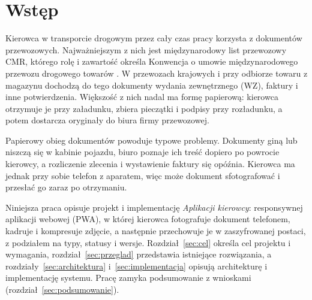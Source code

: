 \section{Wstęp}
\label{sec:wstep}

Kierowca w transporcie drogowym przez cały czas pracy korzysta z dokumentów
przewozowych. Najważniejszym z nich jest międzynarodowy list przewozowy CMR,
którego rolę i zawartość określa Konwencja o umowie międzynarodowego przewozu
drogowego towarów \cite{konwencja_cmr}. W przewozach krajowych i przy odbiorze
towaru z magazynu dochodzą do tego dokumenty wydania zewnętrznego (WZ),
faktury i inne potwierdzenia. Większość z nich nadal ma formę papierową:
kierowca otrzymuje je przy załadunku, zbiera pieczątki i podpisy przy rozładunku,
a potem dostarcza oryginały do biura firmy przewozowej.

Papierowy obieg dokumentów powoduje typowe problemy. Dokumenty giną lub niszczą
się w kabinie pojazdu, biuro poznaje ich treść dopiero po powrocie kierowcy,
a rozliczenie zlecenia i wystawienie faktury się opóźnia. Kierowca ma jednak
przy sobie telefon z aparatem, więc może dokument sfotografować i przesłać go
zaraz po otrzymaniu.

Niniejsza praca opisuje projekt i implementację \emph{Aplikacji kierowcy}:
responsywnej aplikacji webowej (PWA), w której kierowca fotografuje dokument
telefonem, kadruje i kompresuje zdjęcie, a następnie przechowuje je
w zaszyfrowanej postaci, z podziałem na typy, statusy i wersje.
Rozdział~\ref{sec:cel} określa cel projektu i wymagania, rozdział~\ref{sec:przeglad}
przedstawia istniejące rozwiązania, a rozdziały~\ref{sec:architektura}
i~\ref{sec:implementacja} opisują architekturę i implementację systemu.
Pracę zamyka podsumowanie z wnioskami (rozdział~\ref{sec:podsumowanie}).
